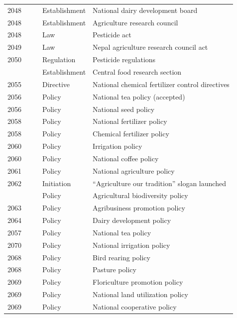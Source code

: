 \documentclass[
  openany]{book}
\begin{document}
\begin{longtable}[t]{rrrl>{\raggedright\arraybackslash}p{16em}}
\addlinespace
\rowcolor{gray!6}  2048 &  &  & Establishment & National dairy development board\\
2048 &  &  & Establishment & Agriculture research council\\
\rowcolor{gray!6}  2048 &  &  & Law & Pesticide \vphantom{1} act\\
2049 &  &  & Law & Nepal agriculture research council act\\
\rowcolor{gray!6}  2050 &  &  & Regulation & Pesticide \vphantom{1} regulations\\
\addlinespace
2052 &  &  & Establishment & Central food research section\\
\rowcolor{gray!6}  2055 &  &  & Directive & National chemical fertilizer control directives\\
2056 &  &  & Policy & National tea policy (accepted)\\
\rowcolor{gray!6}  2056 &  &  & Policy & National seed policy\\
2058 &  &  & Policy & National fertilizer policy\\
\addlinespace
\rowcolor{gray!6}  2058 &  &  & Policy & Chemical fertilizer policy\\
2060 &  &  & Policy & Irrigation policy\\
\rowcolor{gray!6}  2060 &  &  & Policy & National coffee policy\\
2061 &  &  & Policy & National agriculture policy\\
\rowcolor{gray!6}  2062 &  &  & Initiation & “Agriculture our tradition” slogan launched\\
\addlinespace
2063 &  &  & Policy & Agricultural biodiversity policy\\
\rowcolor{gray!6}  2063 &  &  & Policy & Agribusiness promotion policy\\
2064 &  &  & Policy & Dairy development policy\\
\rowcolor{gray!6}  2057 &  &  & Policy & National tea policy\\
2070 &  &  & Policy & National irrigation policy\\
\addlinespace
\rowcolor{gray!6}  2068 &  &  & Policy & Bird rearing policy\\
2068 &  &  & Policy & Pasture policy\\
\rowcolor{gray!6}  2069 &  &  & Policy & Floriculture promotion policy\\
2069 &  &  & Policy & National land utilization policy\\
\rowcolor{gray!6}  2069 &  &  & Policy & National cooperative policy\\

\end{longtable}
\end{document}
